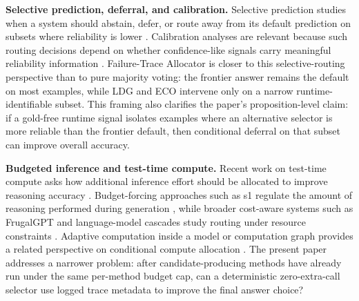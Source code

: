 \medskip\noindent\textbf{Selective prediction, deferral, and calibration.}
Selective prediction studies when a system should abstain, defer, or route away from its default prediction on subsets where reliability is lower \citep{geifman2017selectiveclassificationdeepneural,geifman2019selectivenet}.
Calibration analyses are relevant because such routing decisions depend on whether confidence-like signals carry meaningful reliability information \citep{guo2017calibrationmodernneuralnetworks}.
Failure-Trace Allocator is closer to this selective-routing perspective than to pure majority voting: the frontier answer remains the default on most examples, while LDG and ECO intervene only on a narrow runtime-identifiable subset.
This framing also clarifies the paper's proposition-level claim: if a gold-free runtime signal isolates examples where an alternative selector is more reliable than the frontier default, then conditional deferral on that subset can improve overall accuracy.

\medskip\noindent\textbf{Budgeted inference and test-time compute.}
Recent work on test-time compute asks how additional inference effort should be allocated to improve reasoning accuracy \citep{snell2024scaling,wu2024inference}.
Budget-forcing approaches such as s1 regulate the amount of reasoning performed during generation \citep{muennighoff2025s1}, while broader cost-aware systems such as FrugalGPT and language-model cascades study routing under resource constraints \citep{chen2023frugalgpt,dohan2022language}.
Adaptive computation inside a model or computation graph provides a related perspective on conditional compute allocation \citep{graves2016adaptive}.
The present paper addresses a narrower problem: after candidate-producing methods have already run under the same per-method budget cap, can a deterministic zero-extra-call selector use logged trace metadata to improve the final answer choice?
